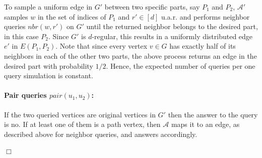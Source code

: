\documentclass{article}
\newcommand{\eps}{\epsilon}
\newcommand{\calA}{{\mathcal{A}}}
\newcommand{\mA}{{\mathcal{A}}}
\newcommand{\trG}{{G'}}
\newcommand{\trA}{{\calA'}}
\newcommand{\tre}{e'}
\newenvironment{proofof}[1]{\smallskip\noindent{\bf Proof of #1:}}%
        {\hspace*{\fill}$\Box$\par}
\newcommand{\commentt}[1]{ {}}
\begin{document}
\begin{proofof}{Theorem~\ref{thm:lb_ck_const_alpha}}
    To sample a uniform edge in $\trG$ between two specific parts, say $P_1$ and $P_2$,  $\trA$ samples $w$ in the set of indices of $P_1$ and $r'\in [d]$ u.a.r. and performs  neighbor queries $nbr(w,r')$ on $\trG$ until the returned neighbor belongs to the desired part, in this case $P_2$. 
    Since $\trG$ is $d$-regular, this results in a uniformly distributed edge $\tre$ in $E(P_1,P_2)$. Note that since every vertex $v\in G$ has exactly half of its neighbors in each of the other two parts, the above process returns an edge in the desired part with probability $1/2$. Hence, the expected number of queries per one query simulation  is constant.

    
    \paragraph{Pair queries $pair(u_1,u_2)$:} 
    If the two queried vertices are original vertices in $\trG$ then the answer to the query is no. If at least one of them is a path vertex, then $\mA$ maps it to an edge, as described above for neighbor queries, and answers accordingly.

\end{proofof}
\end{document}
